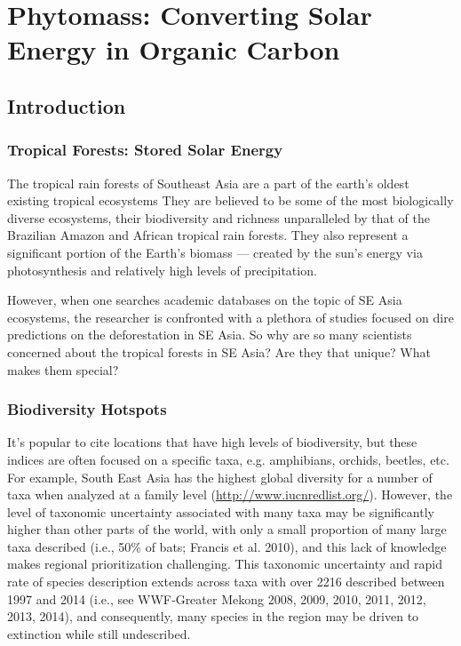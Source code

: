 \chapter{Phytomass: Converting Solar Energy in Organic Carbon}

\section{Introduction}

\subsection{Tropical Forests: Stored Solar Energy}

The tropical rain forests of Southeast Asia are a part of the earth's oldest existing tropical ecosystems They are believed to be some of the most biologically diverse ecosystems, their biodiversity and richness unparalleled by that of the Brazilian Amazon and African tropical rain forests. They also represent a significant portion of the Earth's biomass --- created by the sun's energy via photosynthesis and relatively high levels of precipitation.

However, when one searches academic databases on the topic of SE Asia ecosystems, the researcher is confronted with a plethora of studies focused on dire predictions on the deforestation in SE Asia. So why are so many scientists concerned about the tropical forests in SE Asia? Are they that unique?  What makes them special?

\subsection{Biodiversity Hotspots}

It's popular to cite locations that have high levels of biodiversity, but these indices are often focused on a specific taxa, e.g. amphibians, orchids, beetles, etc. For example, South East Asia has the highest global diversity for a number of taxa when analyzed at a family level (\url{http://www.iucnredlist.org/}). However, the level of taxonomic uncertainty associated with many taxa may be significantly higher than other parts of the world, with only a small proportion of many large taxa described (i.e., 50\% of bats; Francis et al. 2010), and this lack of knowledge makes regional prioritization challenging. This taxonomic uncertainty and rapid rate of species description extends across taxa with over 2216 described between 1997 and 2014 (i.e., see WWF‐Greater Mekong 2008, 2009, 2010, 2011, 2012, 2013, 2014), and consequently, many species in the region may be driven to extinction while still undescribed.

